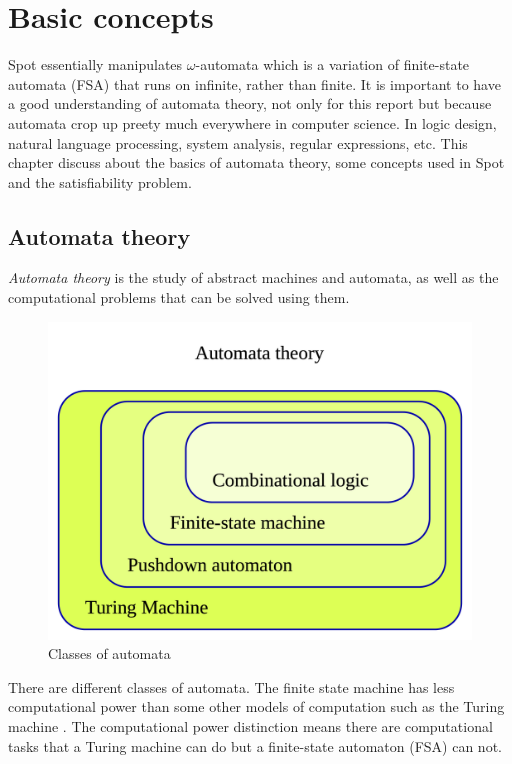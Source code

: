 \chapter{Basic concepts}
\label{basic_concepts}
Spot essentially manipulates $\omega$-automata which is a variation of finite-state automata (FSA) that runs
on infinite, rather than finite. It is important to have a good understanding of automata theory,
not only for this report but because automata crop up preety much everywhere in computer
science. In logic design, natural language processing, system analysis, regular expressions, etc. This
chapter discuss about the basics of automata theory, some concepts used in Spot and the satisfiability
problem.

\section{Automata theory}
\textit{Automata theory} \cite{9} is the study of abstract machines and automata, as well as the
computational problems that can be solved using them.

\begin{figure}[H]
 \centering
 \includegraphics[scale=0.2]{img/automata_classes.png}
 \caption{Classes of automata \cite{9}}
 \label{fig:aut_classes}
\end{figure}
There are different classes of automata. The finite state machine has less computational power than
some other models of computation such as the Turing machine \cite{10}. The computational power distinction
means there are computational tasks that a Turing machine can do but a finite-state automaton (FSA) can
not.\\

